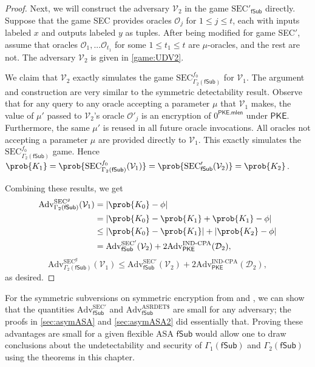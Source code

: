 \begin{proof}
Next, we will construct the adversary $\mathcal{V}_2$ in the game $\mathrm{SEC'}_{\mathsf{fSub}}$ directly. Suppose that the game SEC provides oracles $\mathcal{O}_j$ for $1\le j\le t$, each with inputs labeled $x$ and outputs labeled $y$ as tuples. After being modified for game SEC$'$, assume that oracles $\mathcal{O}_1, ... \mathcal{O}_{t_1}$ for some $1 \le t_1 \le t$ are $\mu$-oracles, and the rest are not. The adversary $\mathcal{V}_2$ is given in \autoref{game:UDV2}.

We claim that $\mathcal{V}_2$ exactly simulates the game $\mathrm{SEC}^{f_0}_{\Gamma_2(\mathsf{fSub})}$ for $\mathcal{V}_1$. The argument and construction are very similar to the symmetric detectability result. Observe that for any query to any oracle accepting a parameter $\mu$ that $\mathcal{V}_1$ makes, the value of $\mu'$ passed to $\mathcal{V}_2$'s oracle $\mathcal{O}'_j$ is an encryption of $0^\mathsf{PKE.mlen}$ under $\mathsf{PKE}$. Furthermore, the same $\mu'$ is reused in all future oracle invocations. All oracles not accepting a parameter $\mu$ are provided directly to $\mathcal{V}_1$. This exactly simulates the $\mathrm{SEC}^{f_0}_{\Gamma_2(\mathsf{fSub})}$ game. Hence $\prob{K_1}=\prob{\mathrm{SEC}^{f_0}_{\Gamma_2(\mathsf{fSub})}(\mathcal{V}_1)}=\prob{\mathrm{SEC}'_{\mathsf{fSub}}(\mathcal{V}_2)}=\prob{K_2}$.

Combining these results, we get
\iffullversion
\begin{align*}
\mathrm{Adv}^{\mathrm{SEC}^g}_{\Gamma_2(\mathsf{fSub})}(\mathcal{V}_1)
&= |\prob{K_0}-\phi| \\
&= |\prob{K_0}-\prob{K_1}+\prob{K_1}-\phi| \\
&\le |\prob{K_0}-\prob{K_1}|+|\prob{K_2}-\phi| \\
&= \mathrm{Adv}^{\mathrm{SEC'}}_{\mathsf{fSub}}(\mathcal{V}_2) + 2\mathrm{Adv}^{\mathrm{IND}\text{-}\mathrm{CPA}}_\mathsf{PKE}(\mathcal{D}_2),
\end{align*}
\else
\[
\mathrm{Adv}^{\mathrm{SEC}^g}_{\Gamma_2(\mathsf{fSub})}(\mathcal{V}_1) \le \mathrm{Adv}^{\mathrm{SEC'}}_{\mathsf{fSub}}(\mathcal{V}_2) + 2\mathrm{Adv}^{\mathrm{IND}\text{-}\mathrm{CPA}}_\mathsf{PKE}(\mathcal{D}_2),
\]
\fi
as desired.
\end{proof}

For the symmetric subversions on symmetric encryption from \cite{C:BelPatRog14} and \cite{CCS:BelJaeKan15}, we can show that the quantities $\mathrm{Adv}^{\mathrm{SEC'}}_{\mathsf{fSub}}$ and $\mathrm{Adv}^{\mathrm{ASRDET}\$}_{\mathsf{fSub}}$ are small for any adversary; the proofs in \autoref{sec:asymASA} and \autoref{sec:asymASA2} did essentially that. Proving these advantages are small for a given flexible ASA $\mathsf{fSub}$ would allow one to draw conclusions about the undetectability and security of $\Gamma_1(\mathsf{fSub})$ and $\Gamma_2(\mathsf{fSub})$ using the theorems in this chapter.